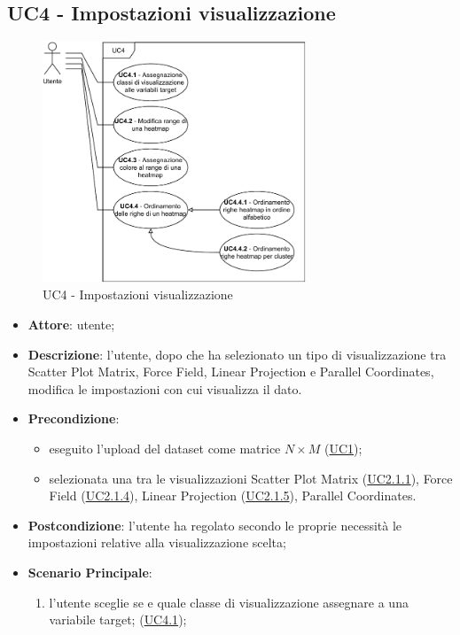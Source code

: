\subsection{UC4 - Impostazioni visualizzazione}
\label{uc4}

    \begin{figure}[htbp]
        \centering
        \includegraphics[width=0.7\textwidth]{source/sections/casi-uso/diagrams/uc4.pdf}
        \caption{UC4 - Impostazioni visualizzazione}
        \label{fig:uc4}
    \end{figure}

\begin{itemize}
    \item \textbf{Attore}: utente;
    \item \textbf{Descrizione}: l'utente, dopo che ha selezionato un tipo di visualizzazione tra Scatter Plot Matrix, Force Field, Linear Projection e Parallel Coordinates, modifica le impostazioni con cui visualizza il dato.
    \item \textbf{Precondizione}: 
    \begin{itemize}
        \item eseguito l'upload del dataset come matrice $N\times M$ (\hyperref[uc1]{UC1});
        \item selezionata una tra le visualizzazioni Scatter Plot Matrix (\hyperref[uc2.1.1]{UC2.1.1}), Force Field (\hyperref[uc2.1.4]{UC2.1.4}), Linear Projection (\hyperref[uc2.1.5]{UC2.1.5}), Parallel Coordinates.
    \end{itemize}  
    \item \textbf{Postcondizione}: l'utente ha regolato secondo le proprie necessità le impostazioni relative alla visualizzazione scelta;
    \item \textbf{Scenario Principale}: 
    \begin{enumerate}
        \item l'utente sceglie se e quale classe di visualizzazione assegnare a una variabile target; (\hyperref[uc4.1]{UC4.1});
    \end{enumerate}  
    \end{itemize}


